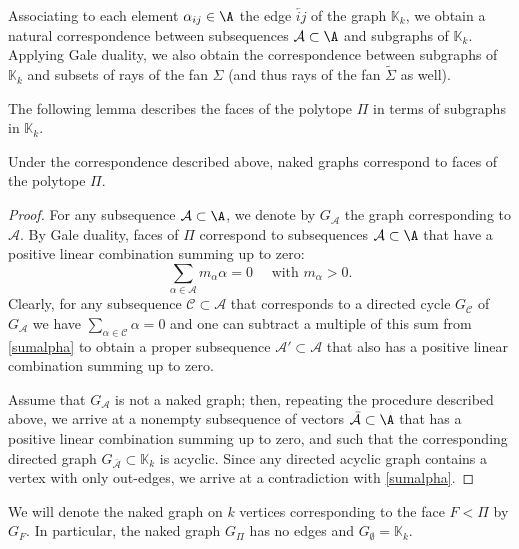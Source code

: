 Associating to each element $\alpha_{ij}\in \A $  the edge $\overleftarrow{ij}$ of the graph $\mathbb{K}_k$, we obtain a natural correspondence  between subsequences
$\mathcal{A}\subset\A$ and subgraphs of $\mathbb{K}_k$.  Applying Gale 
duality, we also obtain the correspondence 
between subgraphs of $\mathbb{K}_k$ and subsets of rays of the fan $\Sigma$ 
(and thus rays of the fan $\widetilde{\Sigma}$ as well). \label{corresp}


The following lemma describes the faces of the polytope $\Pi$ in terms of subgraphs in $\mathbb{K}_k$. 
\begin{lemma}\label{facegraphs}
Under the correspondence described above, naked graphs correspond to  faces of the polytope $\Pi$. 
\end{lemma}
\begin{proof}
For any subsequence $\mathcal{A}\subset\A$,  
we denote by $G_\mathcal{A}$ the graph 
corresponding to $\mathcal{A}$. 
By Gale duality, faces of $\Pi$ correspond to subsequences 
$\mathcal{A}\subset\A$  that have a positive linear combination summing up 
to zero:
\begin{equation}\label{sumalpha}
 \sum_{\alpha\in \mathcal{A}} m_{\alpha}\alpha = 0\quad\text{ with 
 }m_{\alpha}>0.
\end{equation}
Clearly, for any subsequence $\mathcal{C}\subset \mathcal{A}$ that corresponds 
to a directed cycle $G_\mathcal{C}$  of $G_\mathcal{A}$ we have 
$\sum_{\alpha\in \mathcal{C}} \alpha=0$ and one can subtract a multiple of this 
sum from \eqref{sumalpha} to obtain a proper subsequence 
$\mathcal{A}'\subset\mathcal{A}$ that also has a positive linear combination summing up to zero.

Assume that $G_\mathcal{A}$ is not a naked graph; then, repeating the procedure 
described above, we arrive at a nonempty subsequence of vectors 
$\bar{\mathcal{A}}\subset\A$ that has a positive linear combination summing up 
to zero, 
and such that the corresponding 
directed graph $G_{\bar{\mathcal{A}}}\subset \mathbb{K}_k$ is acyclic. Since 
any directed acyclic graph contains a vertex with only out-edges, we arrive at 
a  contradiction with \eqref{sumalpha}. 
\end{proof}

\begin{nota}\label{not:naked} We will denote the naked graph on  
$k$ vertices corresponding to the face $F<\Pi$ by $G_F$.  In particular, the naked graph $G_\Pi$ has no edges and $G_\emptyset=\mathbb{K}_k$.  
\end{nota}

